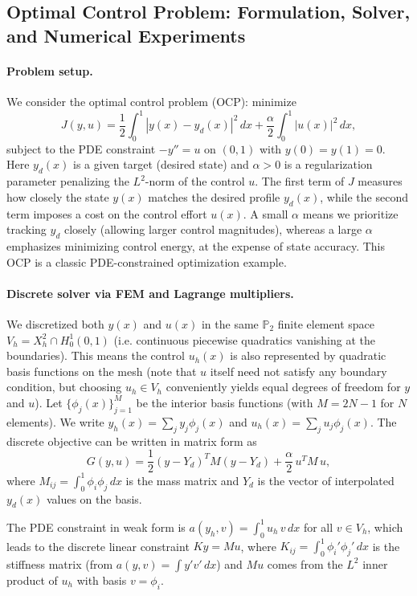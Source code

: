 
\subsection{Optimal Control Problem: Formulation, Solver, and Numerical Experiments}

\paragraph{Problem setup.} We consider the optimal control problem (OCP): minimize
\[
	J(y,u) = \frac{1}{2}\int_0^1 |y(x)-y_d(x)|^2\,dx + \frac{\alpha}{2}\int_0^1 |u(x)|^2\,dx,
\]
subject to the PDE constraint $-y'' = u$ on $(0,1)$ with $y(0)=y(1)=0$. Here $y_d(x)$ is a given target (desired state) and $\alpha>0$ is a regularization parameter penalizing the $L^2$-norm of the control $u$. The first term of $J$ measures how closely the state $y(x)$ matches the desired profile $y_d(x)$, while the second term imposes a cost on the control effort $u(x)$. A small $\alpha$ means we prioritize tracking $y_d$ closely (allowing larger control magnitudes), whereas a large $\alpha$ emphasizes minimizing control energy, at the expense of state accuracy. This OCP is a classic PDE-constrained optimization example.

\paragraph{Discrete solver via FEM and Lagrange multipliers.} We discretized both $y(x)$ and $u(x)$ in the same $\mathbb{P}_2$ finite element space $V_h = X_h^2 \cap H_0^1(0,1)$ (i.e. continuous piecewise quadratics vanishing at the boundaries). This means the control $u_h(x)$ is also represented by quadratic basis functions on the mesh (note that $u$ itself need not satisfy any boundary condition, but choosing $u_h\in V_h$ conveniently yields equal degrees of freedom for $y$ and $u$). Let $\{\phi_j(x)\}_{j=1}^{M}$ be the interior basis functions (with $M=2N-1$ for $N$ elements). We write $y_h(x)=\sum_j y_j\phi_j(x)$ and $u_h(x)=\sum_j u_j\phi_j(x)$. The discrete objective can be written in matrix form as
\[
	G(y,u) = \frac{1}{2}(y-Y_d)^T M(y-Y_d) + \frac{\alpha}{2}\,u^T M\,u,
\]
where $M_{ij}=\int_0^1 \phi_i\phi_j\,dx$ is the mass matrix and $Y_d$ is the vector of interpolated $y_d(x)$ values on the basis.

The PDE constraint in weak form is $a(y_h,v) = \int_0^1 u_h\,v\,dx$ for all $v\in V_h$, which leads to the discrete linear constraint $Ky = Mu$, where $K_{ij}=\int_0^1 \phi_i'\phi_j'\,dx$ is the stiffness matrix (from $a(y,v)=\int y'v'\,dx$) and $Mu$ comes from the $L^2$ inner product of $u_h$ with basis $v=\phi_i$.

